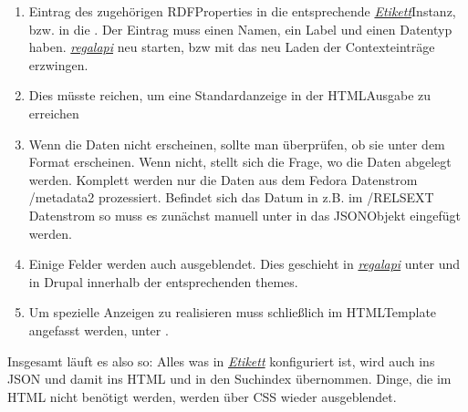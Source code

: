 \documentclass[letterpaper,10pt,english]{sphinxmanual}
\begin{document}
\begin{sphinxVerbatim}[commandchars=\\\{\}]
   
\end{sphinxVerbatim}
\begin{enumerate}
%
\item {} 
\sphinxAtStartPar
Eintrag des zugehörigen RDF\sphinxhyphen{}Properties in die entsprechende
{\hyperref[\detokenize{toscience:_etikett}]{\emph{Etikett}}}\sphinxhyphen{}Instanz, bzw. in die .
Der Eintrag muss einen Namen, ein Label und einen Datentyp haben.
{\hyperref[\detokenize{toscience:_regal_api_2}]{\emph{regal\sphinxhyphen{}api}}} neu starten, bzw mit
 das neu Laden der Contexteinträge erzwingen.

\item {} 
\sphinxAtStartPar
Dies müsste reichen, um eine Standardanzeige in der HTML\sphinxhyphen{}Ausgabe zu
erreichen

\item {} 
\sphinxAtStartPar
Wenn die Daten nicht erscheinen, sollte man überprüfen, ob sie unter
dem Format  erscheinen. Wenn nicht, stellt sich die Frage,
wo die Daten abgelegt werden. Komplett werden nur die Daten aus dem
Fedora Datenstrom /metadata2 prozessiert. Befindet sich das Datum in
z.B. im /RELS\sphinxhyphen{}EXT Datenstrom so muss es zunächst manuell unter
 in das JSON\sphinxhyphen{}Objekt eingefügt werden.

\item {} 
\sphinxAtStartPar
Einige Felder werden auch ausgeblendet. Dies geschieht in
{\hyperref[\detokenize{toscience:_regal_api_2}]{\emph{regal\sphinxhyphen{}api}}} unter 
und in Drupal innerhalb der entsprechenden themes.

\item {} 
\sphinxAtStartPar
Um spezielle Anzeigen zu realisieren muss schließlich im
HTML\sphinxhyphen{}Template angefasst werden, unter
 .

\end{enumerate}

\sphinxAtStartPar
Insgesamt läuft es also so: Alles was in {\hyperref[\detokenize{toscience:_etikett}]{\emph{Etikett}}}
konfiguriert ist, wird auch ins JSON und damit ins HTML und in den
Suchindex übernommen. Dinge, die im HTML nicht benötigt werden, werden
über CSS wieder ausgeblendet.
\end{document}
